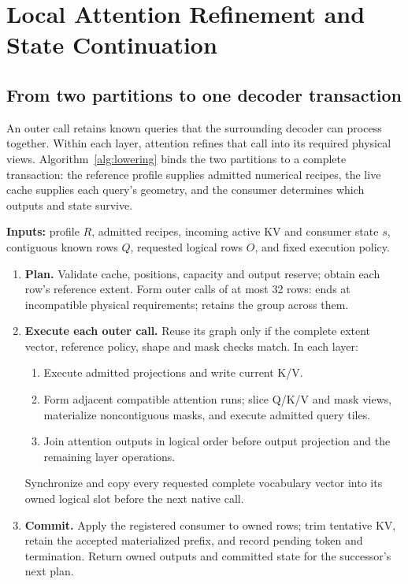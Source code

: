 \section{Local Attention Refinement and State Continuation}
\label{sec:method}

\subsection{From two partitions to one decoder transaction}
An outer call retains known queries that the surrounding decoder can process together. Within each layer, attention refines that call into its required physical views. Algorithm~\ref{alg:lowering} binds the two partitions to a complete transaction: the reference profile supplies admitted numerical recipes, the live cache supplies each query's geometry, and the consumer determines which outputs and state survive.

\begin{algorithm}[tbp]
\caption{Execute known queries under a registered reference profile}
\label{alg:lowering}
\small
\textbf{Inputs:} profile $R$, admitted recipes, incoming active KV and consumer state $s$, contiguous known rows $Q$, requested logical rows $O$, and fixed execution policy.
\begin{enumerate}
\item \textbf{Plan.} Validate cache, positions, capacity and output reserve; obtain each row's reference extent. Form outer calls of at most 32 rows: \Simple{} ends at incompatible physical requirements; \Local{} retains the group across them.
\item \textbf{Execute each outer call.} Reuse its graph only if the complete extent vector, reference policy, shape and mask checks match. In each layer:
\begin{enumerate}
\item Execute admitted projections and write current K/V.
\item Form adjacent compatible attention runs; slice Q/K/V and mask views, materialize noncontiguous masks, and execute admitted query tiles.
\item Join attention outputs in logical order before output projection and the remaining layer operations.
\end{enumerate}
Synchronize and copy every requested complete vocabulary vector into its owned logical slot before the next native call.
\item \textbf{Commit.} Apply the registered consumer to owned rows; trim tentative KV, retain the accepted materialized prefix, and record pending token and termination. Return owned outputs and committed state for the successor's next plan.
\end{enumerate}
\end{algorithm}

